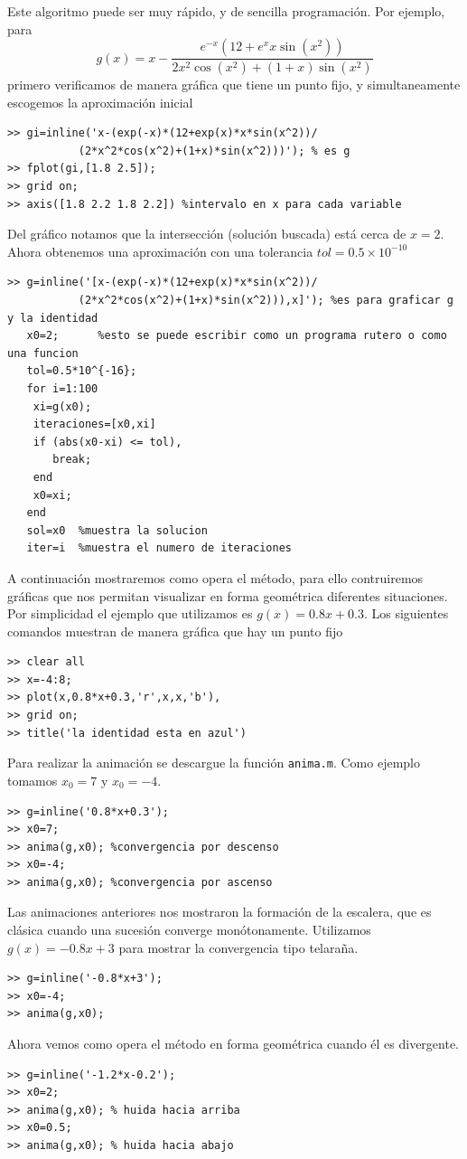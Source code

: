 \documentclass[11pt]{article}
\begin{document}
Este algoritmo puede ser muy r\'apido, y de sencilla programaci\'on. Por ejemplo, para 
$$g(x)=x-\frac{e^{-x}(12+e^x x\sin(x^2))}{2x^2\cos(x^2)+(1+x)\sin(x^2)}$$
primero verificamos de manera gr\'afica que tiene un punto fijo, y simultaneamente escogemos la aproximaci\'on inicial 
\begin{lstlisting}
>> gi=inline('x-(exp(-x)*(12+exp(x)*x*sin(x^2))/
           (2*x^2*cos(x^2)+(1+x)*sin(x^2)))'); % es g 
>> fplot(gi,[1.8 2.5]);
>> grid on;
>> axis([1.8 2.2 1.8 2.2]) %intervalo en x para cada variable
\end{lstlisting}
Del gr\'afico notamos que la intersecci\'on (soluci\'on buscada) est\'a cerca de $x=2$. Ahora obtenemos una aproximaci\'on con una tolerancia $tol=0.5\times 10^{-10}$
\begin{lstlisting}
>> g=inline('[x-(exp(-x)*(12+exp(x)*x*sin(x^2))/
           (2*x^2*cos(x^2)+(1+x)*sin(x^2))),x]'); %es para graficar g y la identidad
   x0=2;      %esto se puede escribir como un programa rutero o como una funcion
   tol=0.5*10^{-16};
   for i=1:100
    xi=g(x0);
    iteraciones=[x0,xi]
    if (abs(x0-xi) <= tol),
       break;
    end
    x0=xi;
   end
   sol=x0  %muestra la solucion
   iter=i  %muestra el numero de iteraciones
\end{lstlisting}
A continuaci\'on mostraremos como opera el m\'etodo, para ello contruiremos  gr\'aficas que nos permitan visualizar en forma geom\'etrica  diferentes situaciones. Por simplicidad el  ejemplo que utilizamos es $g(x)=0.8x+0.3$. Los siguientes comandos muestran de manera gr\'afica que hay un punto fijo
\begin{lstlisting}
>> clear all
>> x=-4:8;
>> plot(x,0.8*x+0.3,'r',x,x,'b'),
>> grid on;
>> title('la identidad esta en azul')
\end{lstlisting}
Para realizar la animaci\'on se descargue la funci\'on {\tt anima.m}. Como ejemplo tomamos $x_0=7$ y $x_0=-4$.
\begin{lstlisting}
>> g=inline('0.8*x+0.3');
>> x0=7;
>> anima(g,x0); %convergencia por descenso
>> x0=-4;
>> anima(g,x0); %convergencia por ascenso
\end{lstlisting}
Las animaciones anteriores nos mostraron la formaci\'on de la escalera, que es cl\'asica cuando una sucesi\'on converge mon\'otonamente. Utilizamos $g(x)=-0.8x+3$ para mostrar la convergencia tipo telara\~na.
\begin{lstlisting}
>> g=inline('-0.8*x+3');
>> x0=-4;
>> anima(g,x0);
\end{lstlisting}
Ahora vemos como opera el m\'etodo en forma geom\'etrica cuando \'el es divergente.
\begin{lstlisting}
>> g=inline('-1.2*x-0.2');
>> x0=2;
>> anima(g,x0); % huida hacia arriba
>> x0=0.5;
>> anima(g,x0); % huida hacia abajo
\end{lstlisting}
\end{document}
